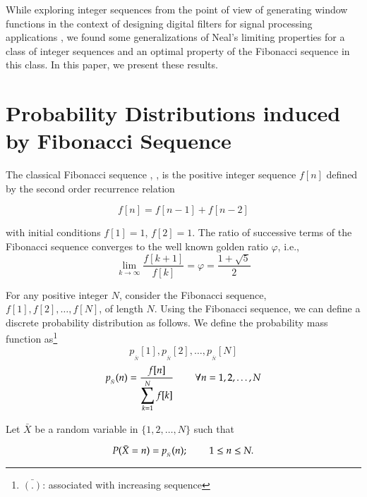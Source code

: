 \begin{multicols}{2}
While exploring integer sequences from the point of view of generating window functions in the context of designing digital filters for signal processing applications \cite{art2-key02}, we found some generalizations of Neal's limiting properties for a class of integer sequences and an optimal property of the Fibonacci sequence in this class. In this paper, we present these results.

\section{Probability Distributions induced by Fibonacci Sequence}\label{section-2}

The classical Fibonacci sequence \cite{art2-key03}, \cite{art2-key04}, is the positive integer sequence $f[n]$ defined by the second order recurrence relation


  \begin{equation}
  f[n] = f[n-1] + f[n-2]\label{eq-2.1}
    \end{equation}

with initial conditions $f[1] = 1$, $f[2] = 1$.
The ratio of successive terms of the Fibonacci sequence converges to the well known golden ratio $\varphi$, i.e.,
\begin{equation}
\lim_{k \rightarrow \infty} \frac{f[k+1]}{f[k]} = \varphi = \displaystyle{\frac{1 + \sqrt5}{2}}\label{eq-2.2}
\end{equation}

For any positive integer $N$, consider the Fibonacci sequence, $f[1], f[2], \ldots, f[N]$, of length $N$. Using the Fibonacci sequence, we can define a discrete probability distribution as follows. We define the probability mass function as\footnote{${\bar{(.)}}$: associated with increasing sequence}
$$
p_{_{\bar{N}}}[1], p_{_{\bar{N}}}[2], \ldots, p_{_{\bar{N}}}[N]
$$
\begin{equation}
 p_{_{\bar{N}}}(n) = \frac{f[n]}{\displaystyle{\sum_{k =1}^N f[k]}} \hspace{0.3in} \forall n = 1, 2, \ldots, N \label{eq-2.3}
 \end{equation}

Let $\bar{X}$ be a random variable in $\{1,2, \ldots, N\}$ such that  
 
\begin{equation}
P(\bar{X} = n) = p_{_{\bar{N}}}(n); \hspace{0.3in} 1 \leq n\leq N.\label{eq-2.4}
\end{equation}
 

\end{multicols}
